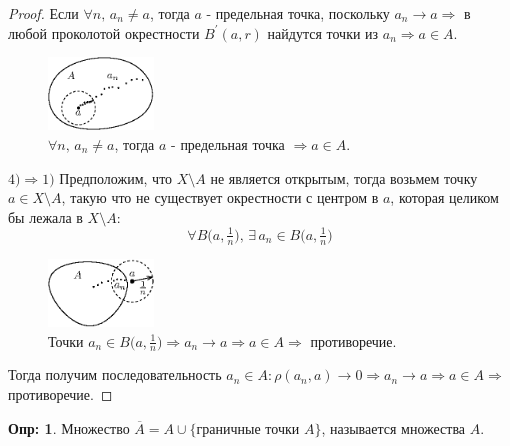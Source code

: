 \documentclass[12pt]{article}
\theoremstyle{definition}
\newtheorem{defn}{Опр:}
\begin{document}
\begin{proof}
	Если $\forall n, \, a_n \neq a$, тогда $a$ - предельная точка, поскольку $a_n \to a \Rightarrow$ в любой проколотой окрестности $B^\prime(a,r)$ найдутся точки из $a_n \Rightarrow a \in A$.
	\begin{figure}[H]
		\centering
		\includegraphics[width=0.25\textwidth]{7_6.eps}
		\caption{ $\forall n, \, a_n \neq a$, тогда $a$ - предельная точка $\Rightarrow a \in A$.}
		\label{7_6}
	\end{figure}
	$4) \Rightarrow 1)$ Предположим, что $X \setminus A$ не является открытым, тогда возьмем точку $a \in X \setminus A$, такую что не существует окрестности с центром в $a$, которая целиком бы лежала в $X \setminus A$:
	$$
		\forall B\big(a,\tfrac{1}{n}\big), \, \exists \, a_n \in B\big(a,\tfrac{1}{n}\big)
	$$	
	\begin{figure}[H]
		\centering
		\includegraphics[width=0.25\textwidth]{7_7.eps}
		\caption{ Точки $a_n \in B\big(a,\tfrac{1}{n}\big) \Rightarrow a_n \to a \Rightarrow a \in A \Rightarrow$ противоречие.}
		\label{7_7}
	\end{figure}
	Тогда получим последовательность $a_n \in A \colon  \rho(a_n,a) \to 0 \Rightarrow a_n \to a \Rightarrow a \in A \Rightarrow$ противоречие.
\end{proof}

\begin{defn}
	Множество $\overline{A} = A \cup \{\text{граничные точки } A\}$, называется  множества $A$.
\end{defn}
\end{document}
